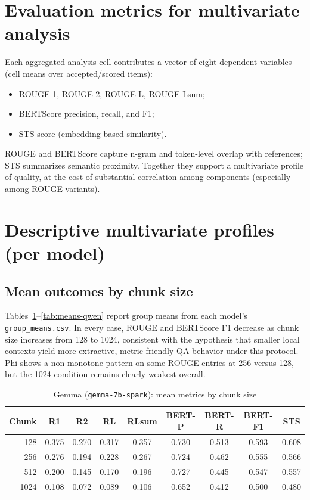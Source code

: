 \documentclass[11pt]{article}
\begin{document}
\section{Evaluation metrics for multivariate analysis}

Each aggregated analysis cell contributes a vector of eight dependent variables (cell means over accepted/scored items):
\begin{itemize}[noitemsep]
    \item ROUGE-1, ROUGE-2, ROUGE-L, ROUGE-Lsum;
    \item BERTScore precision, recall, and F1;
    \item STS score (embedding-based similarity).
\end{itemize}

ROUGE and BERTScore capture n-gram and token-level overlap with references; STS summarizes semantic proximity. Together they support a multivariate profile of quality, at the cost of substantial correlation among components (especially among ROUGE variants).

\section{Descriptive multivariate profiles (per model)}

\subsection{Mean outcomes by chunk size}

Tables~\ref{tab:means-gemma}--\ref{tab:means-qwen} report group means from each model's \texttt{group\_means.csv}. In every case, ROUGE and BERTScore F1 decrease as chunk size increases from 128 to 1024, consistent with the hypothesis that smaller local contexts yield more extractive, metric-friendly QA behavior under this protocol. Phi shows a non-monotone pattern on some ROUGE entries at 256 versus 128, but the 1024 condition remains clearly weakest overall.

\begin{table}[H]
\centering
\caption{Gemma (\texttt{gemma-7b-spark}): mean metrics by chunk size}
\label{tab:means-gemma}
\small
\begin{tabular}{rcccccccc}
\toprule
Chunk & R1 & R2 & RL & RLsum & BERT-P & BERT-R & BERT-F1 & STS \\
\midrule
128 & 0.375 & 0.270 & 0.317 & 0.357 & 0.730 & 0.513 & 0.593 & 0.608 \\
256 & 0.276 & 0.194 & 0.228 & 0.267 & 0.724 & 0.462 & 0.555 & 0.566 \\
512 & 0.200 & 0.145 & 0.170 & 0.196 & 0.727 & 0.445 & 0.547 & 0.557 \\
1024 & 0.108 & 0.072 & 0.089 & 0.106 & 0.652 & 0.412 & 0.500 & 0.480 \\
\bottomrule
\end{tabular}
\end{table}
\end{document}
